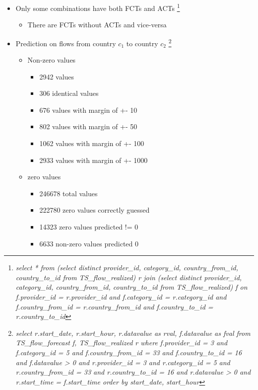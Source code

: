 \begin{itemize}
\begin{itemize}
            \item Only some combinations have both FCTs and ACTs \footnote{\textit{select * from (select distinct provider\_id, category\_id, country\_from\_id, country\_to\_id from TS\_flow\_realized) r join (select distinct provider\_id, category\_id, country\_from\_id, country\_to\_id from TS\_flow\_realized) f on f.provider\_id = r.provider\_id and f.category\_id  = r.category\_id and f.country\_from\_id = r.country\_from\_id and f.country\_to\_id = r.country\_to\_id}}
            \begin{itemize}
                \item There are FCTs without ACTs and vice-versa
            \end{itemize}
            
            \item Prediction on flows from country $c_1$ to country $c_2$ \footnote{\textit{select r.start\_date, r.start\_hour, r.datavalue as rval, f.datavalue as fval from TS\_flow\_forecast f, TS\_flow\_realized r where f.provider\_id = 3 and f.category\_id = 5 and f.country\_from\_id = 33 and f.country\_to\_id = 16 and f.datavalue > 0 and r.provider\_id = 3 and r.category\_id = 5 and r.country\_from\_id = 33 and r.country\_to\_id = 16 and r.datavalue > 0 and r.start\_time = f.start\_time order by start\_date, start\_hour}}
            \begin{itemize}
                \item Non-zero values
                \begin{itemize}
                    \item 2942 values
                    \item 306 identical values
                    \item 676 values with margin of +- 10
                    \item 802 values with margin of +- 50
                    \item 1062 values with margin of +- 100
                    \item 2933 values with margin of +- 1000    
                \end{itemize}
                
                \item zero values
                \begin{itemize}
                    \item 246678 total values
                    \item 222780 zero values correctly guessed
                    \item 14323 zero values predicted != 0
                    \item 6633 non-zero values predicted 0
                \end{itemize}
            \end{itemize}
        \end{itemize}
        

\end{itemize}
